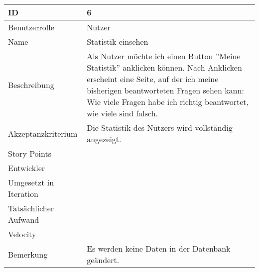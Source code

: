 \begin{tabularx}{\textwidth}{|p{}|X|}
	\hline
	ID & 6\\
	\hline
	Benutzerrolle & Nutzer\\
	\hline
	Name & Statistik einsehen\\
	\hline
	Beschreibung & Als Nutzer möchte ich einen Button ''Meine Statistik'' anklicken können. Nach Anklicken erscheint eine Seite, auf der ich meine bisherigen beantworteten Fragen sehen kann: Wie viele Fragen habe ich richtig beantwortet, wie viele sind falsch.\\
	\hline
	Akzeptanzkriterium & Die Statistik des Nutzers wird vollständig angezeigt.\\
	\hline
	Story Points & \\
	\hline
	Entwickler & \\
	\hline
	Umgesetzt in Iteration & \\
	\hline
	Tatsächlicher Aufwand & \\
	\hline
	Velocity & \\
	\hline
	Bemerkung &  Es werden keine Daten in der Datenbank geändert.\\
	\hline
\end{tabularx}
\vspace{20pt}
